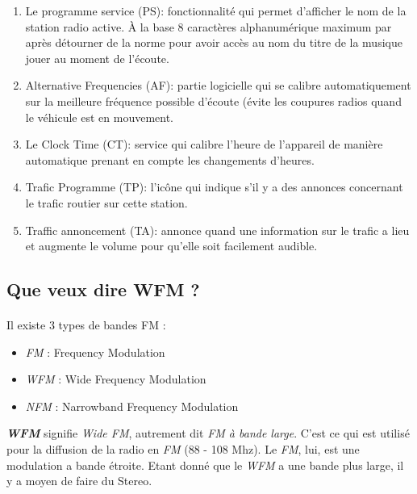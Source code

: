 \documentclass[a4paper]{article}
\begin{document}
\begin{enumerate}
    \item Le programme service (PS): fonctionnalité qui permet d’afficher le nom de la station radio active. À la base 8 caractères alphanumérique maximum par après détourner de la norme pour avoir accès au nom du titre de la musique jouer au moment de l’écoute.
    \item Alternative Frequencies (AF): partie logicielle qui se calibre automatiquement sur la meilleure fréquence possible d’écoute (évite les coupures radios quand le véhicule est en mouvement.
    \item Le Clock Time (CT): service qui calibre l’heure de l’appareil de manière automatique prenant en compte les changements d’heures.
    \item Trafic Programme (TP): l’icône qui indique s'il y a des annonces concernant le trafic routier sur cette station.
    \item Traffic annoncement (TA): annonce quand une information sur le trafic a lieu et augmente le volume pour qu’elle soit facilement audible.
\end{enumerate}










\subsection{Que veux dire WFM ?}





\paragraph{}
Il existe 3 types de bandes FM :
\begin{itemize}
    \item \emph{FM} : Frequency Modulation
    \item \emph{WFM} : Wide Frequency Modulation
    \item  \emph{NFM} : Narrowband Frequency Modulation
\end{itemize}

\emph{\textbf{WFM}} signifie \emph{Wide FM}, autrement dit \emph{FM à bande large}. C'est ce qui est utilisé pour la diffusion de
la radio en \emph{FM} (88 - 108 Mhz). Le \emph{FM}, lui, est une modulation a bande étroite.
Etant donné que le \emph{WFM} a une bande plus large, il y a moyen de faire du Stereo.
\end{document}
